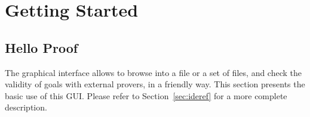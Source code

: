 \chapter{Getting Started}
\label{chap:started}

\section{Hello Proof}

The graphical interface allows to browse into a file or a set of
files, and check the validity of goals with external provers, in a
friendly way. This section presents the basic use of this GUI. Please
refer to Section~\ref{sec:ideref} for a more complete description.



